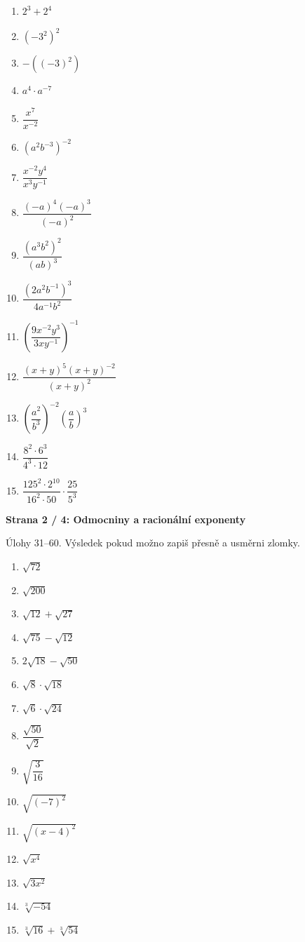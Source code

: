 \documentclass[11pt,a4paper]{article}
\newcommand{\studenthead}[2]{%
  {\large\bfseries #1}\par\vspace{1mm}
  {\footnotesize #2}\par\vspace{2.4mm}}
\begin{document}
\begin{minipage}[t]{.49\textwidth}
\begin{enumerate}[label=\textbf{\arabic*.},leftmargin=8mm,itemsep=11pt,topsep=3pt,start=16]
\normalsize
\item $2^3+2^4$
\item $(-3^2)^2$
\item $-((-3)^2)$
\item $a^4\cdot a^{-7}$
\item $\dfrac{x^7}{x^{-2}}$
\item $(a^2b^{-3})^{-2}$
\item $\dfrac{x^{-2}y^4}{x^3y^{-1}}$
\item $\dfrac{(-a)^4(-a)^3}{(-a)^2}$
\item $\dfrac{(a^3b^2)^2}{(ab)^3}$
\item $\dfrac{(2a^2b^{-1})^3}{4a^{-1}b^2}$
\item $\left(\dfrac{9x^{-2}y^3}{3xy^{-1}}\right)^{-1}$
\item $\dfrac{(x+y)^5(x+y)^{-2}}{(x+y)^2}$
\item $\left(\dfrac{a^2}{b^3}\right)^{-2}\!\left(\dfrac ab\right)^3$
\item $\dfrac{8^2\cdot6^3}{4^3\cdot12}$
\item $\dfrac{125^2\cdot2^{10}}{16^2\cdot50}\cdot\dfrac{25}{5^3}$
\end{enumerate}
\end{minipage}
\clearpage
\studenthead{Strana 2 / 4: Odmocniny a racionální exponenty}{Úlohy 31--60. Výsledek pokud možno zapiš přesně a usměrni zlomky.}
\noindent\begin{minipage}[t]{.49\textwidth}
\begin{enumerate}[label=\textbf{\arabic*.},leftmargin=8mm,itemsep=11pt,topsep=3pt,start=31]
\normalsize
\item $\sqrt{72}$
\item $\sqrt{200}$
\item $\sqrt{12}+\sqrt{27}$
\item $\sqrt{75}-\sqrt{12}$
\item $2\sqrt{18}-\sqrt{50}$
\item $\sqrt8\cdot\sqrt{18}$
\item $\sqrt6\cdot\sqrt{24}$
\item $\dfrac{\sqrt{50}}{\sqrt2}$
\item $\sqrt{\dfrac3{16}}$
\item $\sqrt{(-7)^2}$
\item $\sqrt{(x-4)^2}$
\item $\sqrt{x^4}$
\item $\sqrt{3x^2}$
\item $\sqrt[3]{-54}$
\item $\sqrt[3]{16}+\sqrt[3]{54}$
\end{enumerate}
\end{minipage}\hfill
\end{document}
